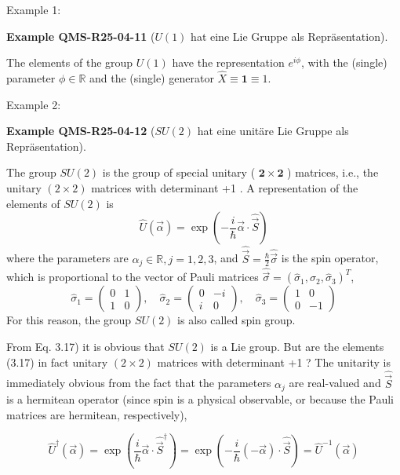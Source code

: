 \documentclass[10pt, letterpaper]{article}
\newcommand{\CustomHeading}[3]{%
  \par\medskip\noindent%
  \textbf{#1 #2} \textnormal{(#3)}.\enskip%
}
\newenvironment{EXA}[2]{\begin{unitbox}\CustomHeading{Example}{#1}{#2}}{\end{unitbox}}
\begin{document}
Example 1: 




\begin{EXA}{QMS-R25-04-11}{$U(1)$ hat eine Lie Gruppe als Repräsentation}
The elements of the group $U(1)$ have the representation $e^{i \phi}$, with the (single) parameter $\phi \in \mathbb{R}$ and the (single) generator $\hat{X} \equiv \mathbf{1} \equiv 1$.
\end{EXA}



Example 2: 

\begin{EXA}{QMS-R25-04-12}{$SU(2)$ hat eine unitäre Lie Gruppe als Repräsentation}
The group $S U(2)$ is the group of special unitary ( $\mathbf{2} \times \mathbf{2}$ ) matrices, i.e., the unitary $(2 \times 2)$ matrices with determinant +1 . A representation of the elements of $S U(2)$ is
$$
\hat{U}(\vec{\alpha})=\exp \left(-\frac{i}{\hbar} \vec{\alpha} \cdot \hat{\vec{S}}\right)
$$
where the parameters are $\alpha_{j} \in \mathbb{R}, j=1,2,3$, and $\hat{\vec{S}}=\frac{\hbar}{2} \hat{\vec{\sigma}}$ is the spin operator, which is proportional to the vector of Pauli matrices $\hat{\vec{\sigma}}=\left(\hat{\sigma}_{1}, \hat{\sigma}_{2}, \hat{\sigma}_{3}\right)^{T}$,
$$
\hat{\sigma}_{1}=\left(\begin{array}{cc}
0 & 1 \\
1 & 0
\end{array}\right), \quad \hat{\sigma}_{2}=\left(\begin{array}{cc}
0 & -i \\
i & 0
\end{array}\right), \quad \hat{\sigma}_{3}=\left(\begin{array}{cc}
1 & 0 \\
0 & -1
\end{array}\right)
$$
For this reason, the group $S U(2)$ is also called spin group.


From Eq. 3.17) it is obvious that $S U(2)$ is a Lie group. But are the elements (3.17) in fact unitary $(2 \times 2)$ matrices with determinant +1 ? The unitarity is immediately obvious from the fact that the parameters $\alpha_{j}$ are real-valued and $\hat{\vec{S}}$ is a hermitean operator (since spin is a physical observable, or because the Pauli matrices are hermitean, respectively),

$$
\hat{U}^{\dagger}(\vec{\alpha})=\exp \left(\frac{i}{\hbar} \vec{\alpha} \cdot \hat{\vec{S}}^{\dagger}\right)=\exp \left(-\frac{i}{\hbar}(-\vec{\alpha}) \cdot \hat{\vec{S}}\right)=\hat{U}^{-1}(\vec{\alpha})
$$


\end{EXA}
\end{document}
